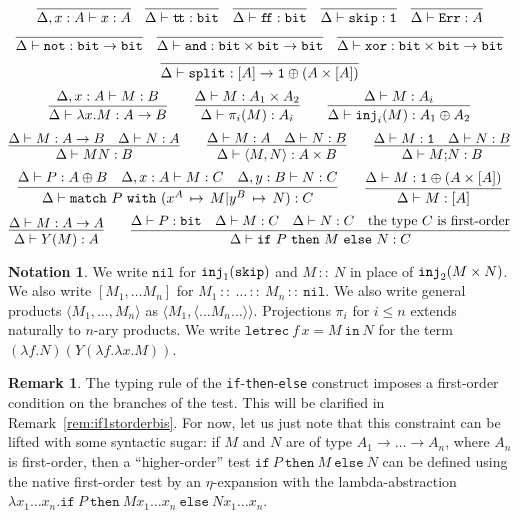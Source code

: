 \documentclass{article}
\theoremstyle{plain}
\theoremstyle{definition}
\newtheorem{notation}[theorem]{Notation}
\newtheorem{remark}[theorem]{Remark}
\newcommand{\PCF}{\mbox{${\bf PCF}^{\bf list}$}}
\newcommand{\bit}{{\tt bit}}
\newcommand{\listtype}[1]{{[}{#1}{]}}
\newcommand{\unittype}{{\tt 1}}
\newcommand{\tunit}{\unittype}
\newcommand{\punit}{\mathtt{skip}}\newcommand{\prodterm}[1]{{\langle{#1}\rangle}}
\newcommand{\letunitterm}[2]{{#1}\mathtt{;}{#2}}
\newcommand{\ttrue}{\mathtt{t\!t}}
\newcommand{\ffalse}{\mathtt{f\!f}}
\newcommand{\iftermx}[3]{{{\mathtt{if}}~{#1}~\mathtt{then}~{#2}~\mathtt{else}~{#3}}}
\newcommand{\inj}{{\tt inj}}
\newcommand{\injl}{\inj_1}
\newcommand{\injr}{\inj_2}
\newcommand{\match}[5]{{{\mathtt{match}}~{#1}~{\mathtt{with}}~({#2\,\mapsto\,#3}\vert{#4\,\mapsto\,#5})}}
\newcommand{\letrec}[4]{{{\mathtt{letrec}}~{#1}\,{#2}={#3}~{\mathtt{in}}~{#4}}}
\newcommand{\errorlist}{{\tt Err}}
\newcommand{\nil}{{\mathtt{nil}}}
\newcommand{\cons}[3][]{{{#2}\,{\mathtt :}{\mathtt :}^{#1}\,{#3}}}
\newcommand{\splitlist}[1][]{{\mathtt{split}^{#1}}}
\begin{document}
\begin{table}[t]
  {\[
  \infer{\Delta,x:A\vdash x:A}{}
  \quad
  \infer{\Delta\vdash \ttrue:\bit}{}
  \quad
  \infer{\Delta\vdash \ffalse:\bit}{}
  \quad
  \infer{\Delta\vdash \punit:\tunit}{}
  \quad
  \infer{\Delta\vdash \errorlist:A}{}
  \]
  \[
  \infer{\Delta\vdash {\tt not}:\bit\to\bit}{}
  \quad
  \infer{\Delta\vdash {\tt and}:\bit\times\bit\to\bit}{}
  \quad
  \infer{\Delta\vdash {\tt xor}:\bit\times\bit\to\bit}{}
  \]
  \[
  \infer{\Delta\vdash \splitlist:\listtype{A}\to\tunit\oplus(A\times\listtype{A})}{}
  \]
  \[
  \infer{\Delta\vdash\lambda x.M : A\to B}{
    \Delta,x:A\vdash M:B
  }
  \qquad
  \infer{\Delta\vdash\pi_i(M):A_i}{
    \Delta\vdash M:A_1\times A_2
  }
  \qquad
  \infer{\Delta\vdash\inj_i(M):A_1\oplus A_2}{
    \Delta\vdash M:A_i
  }
  \]
  \[
  \infer{\Delta\vdash MN : B}{
    \Delta\vdash M : A \to B
    &
    \Delta\vdash N : A
  }
  \qquad
  \infer{\Delta\vdash \prodterm{M,N} : A\times B}{
    \Delta\vdash M : A
    &
    \Delta\vdash N : B
  }
  \qquad
  \infer{\Delta\vdash \letunitterm{M}{N} : B}{
    \Delta\vdash M : \tunit
    &
    \Delta\vdash N : B
  }
  \]
  \[
  \infer{\Delta\vdash \match{P}{x^A}{M}{y^B}{N} : C}{
    \Delta\vdash P : A\oplus B
    &
    \Delta,x:A\vdash M : C
    &
    \Delta,y:B\vdash N : C
  }
  \qquad
  \infer{\Delta\vdash M:\listtype{A}}{
    \Delta\vdash M:\tunit\oplus(A\times\listtype{A})
  }
  \]
  \[
  \infer{\Delta\vdash Y(M):A}{
    \Delta\vdash M : A\to A
  }
  \qquad
  \infer{\Delta\vdash \iftermx{P}{M}{N} : C}{
    \Delta\vdash P : \bit
    &
    \Delta\vdash M : C
    &
    \Delta\vdash N : C
    &
    \textrm{the type $C$ is first-order}
  }
  \]}
  \caption{Typing rules of \PCF{}.}
  \label{tab:typ-rules}
\end{table}

\begin{notation}\label{notation:syntax}\rm
  We write $\nil$ for $\injl(\punit)$ and $\cons MN$ in place of $\injr (M\times N)$. We
  also write $[M_1,\ldots M_n]$ for
  $\cons{M_1}{\cons{\ldots}{\cons{M_n}{\nil}}}$.  We also write
  general products $\prodterm{M_1,\ldots,M_n}$ as
  $\prodterm{M_1,\prodterm{\ldots M_n\ldots}}$. Projections $\pi_i$
  for $i\leq n$ extends naturally to $n$-ary products. We write
  $\letrec{f}{x}{M}{N}$ for the term $(\lambda f.N)(Y(\lambda f.\lambda x.M))$.
\end{notation}

\begin{remark}
  \label{rem:if1storder}
  The typing rule of the {\tt if}-{\tt then}-{\tt else} construct
  imposes a first-order condition on the branches of the test. This
  will be clarified in Remark~\ref{rem:if1storderbis}. For now, let us
  just note that this constraint can be lifted with some syntactic
  sugar: if $M$ and $N$ are of type $A_1\to\ldots\to A_n$, where $A_n$
  is first-order, then a ``higher-order'' test $\iftermx{P}{M}{N}$ can
  be defined using the native first-order test by an $\eta$-expansion
  with  the lambda-abstraction
  $\lambda x_1\ldots
  x_n.\iftermx{P}{Mx_1\ldots x_n}{Nx_1\ldots x_n}$.
\end{remark}
\end{document}
